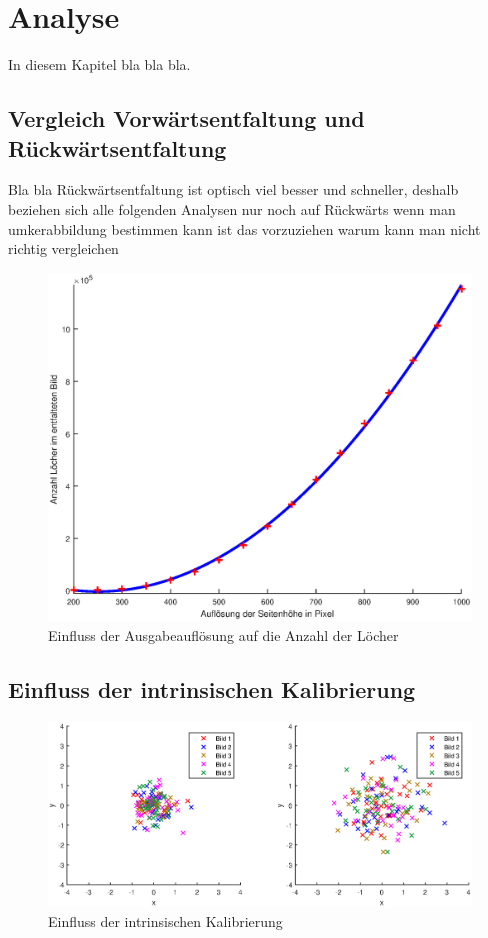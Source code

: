 \chapter{Analyse}
\label{ch:analysis}
In diesem Kapitel bla bla bla.


\section{Vergleich Vorwärtsentfaltung und Rückwärtsentfaltung}

Bla bla Rückwärtsentfaltung ist optisch viel besser und schneller, deshalb beziehen sich alle folgenden Analysen nur noch auf Rückwärts
wenn man umkerabbildung bestimmen kann ist das vorzuziehen
warum kann man nicht richtig vergleichen


\begin{figure}[!htb]
	\centering
	\includegraphics[width=\textwidth]{images/numberOfHoles.eps}
	\caption{Einfluss der Ausgabeauflösung auf die Anzahl der Löcher}
	\label{fig:influenceRes}
\end{figure}

\section{Einfluss der intrinsischen Kalibrierung}

\begin{figure}[!htb]
	\centering
	\includegraphics[width=\textwidth]{images/reprojectionErrorReverse.eps}
	\caption{Einfluss der intrinsischen Kalibrierung}
	\label{fig:influenceCalib}
\end{figure}

